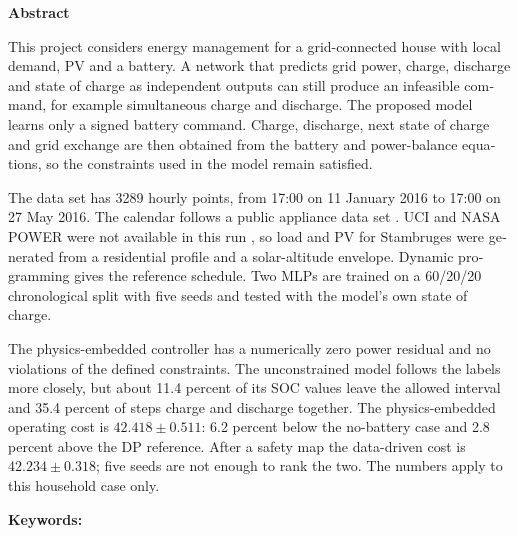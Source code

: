 \thispagestyle{empty}
\begin{latin}
\sloppy
{} %
{\bfseries\fontsize{20pt}{28pt}\selectfont Abstract\par}
\vspace{1.1cm}

This project considers energy management for a grid-connected house with local demand, PV and a battery. A network that predicts grid power, charge, discharge and state of charge as independent outputs can still produce an infeasible command, for example simultaneous charge and discharge. The proposed model learns only a signed battery command. Charge, discharge, next state of charge and grid exchange are then obtained from the battery and power-balance equations, so the constraints used in the model remain satisfied.

The data set has 3289 hourly points, from 17:00 on 11 January 2016 to 17:00 on 27 May 2016. The calendar follows a public appliance data set \cite{candanedo2017energy,candanedo2017uci}. UCI and NASA POWER were not available in this run \cite{nasa2016power}, so load and PV for Stambruges were generated from a residential profile and a solar-altitude envelope. Dynamic programming gives the reference schedule. Two MLPs are trained on a 60/20/20 chronological split with five seeds and tested with the model's own state of charge.

The physics-embedded controller has a numerically zero power residual and no violations of the defined constraints. The unconstrained model follows the labels more closely, but about 11.4 percent of its SOC values leave the allowed interval and 35.4 percent of steps charge and discharge together. The physics-embedded operating cost is $42{.}418 \pm 0{.}511$: 6.2 percent below the no-battery case and 2.8 percent above the DP reference. After a safety map the data-driven cost is $42{.}234 \pm 0{.}318$; five seeds are not enough to rank the two. The numbers apply to this household case only.

\vspace{0.6cm}
\noindent\textbf{Keywords:} \KeywordsEn
\end{latin}
